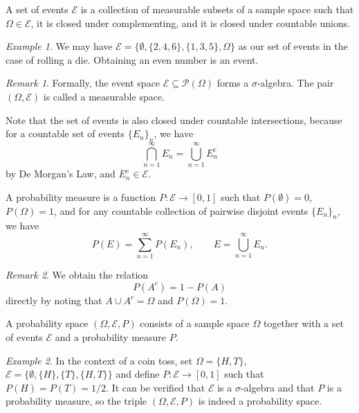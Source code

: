 \documentclass[11pt]{article}
\theoremstyle{definition}
\theoremstyle{remark}
\newtheorem*{remark}{Remark}
\newtheorem*{example}{Example}
\numberwithin{equation}{section}
\begin{document}
    \begin{definition}[Events]
        A set of events $\mathcal{E}$ is a collection of measurable subsets of
        a sample space such that $\Omega \in \mathcal{E}$, it is closed under
        complementing, and it is closed under countable unions.
    \end{definition}
    \begin{example}
        We may have $\mathcal{E} = \{\emptyset, \{2, 4, 6\}, \{1, 3, 5\},
        \Omega\}$ as our set of events in the case of rolling a die.
        Obtaining an even number is an event.
    \end{example}
    \begin{remark}
        Formally, the event space $\mathcal{E} \subseteq \mathcal{P}(\Omega)$ forms
        a $\sigma$-algebra. The pair $(\Omega, \mathcal{E})$ is called a measurable
        space.
    \end{remark}

    Note that the set of events is also closed under countable intersections,
    because for a countable set of events $\{E_n\}_n$, we have \[
        \bigcap_{n = 1}^\infty E_n = \bigcup_{n = 1}^\infty E_n^c
    \] by De Morgan's Law, and $E_n^c \in \mathcal{E}$.
    
    \begin{definition}[Probability]
        A probability measure is a function $P\colon \mathcal{E} \to [0, 1]$ such
        that $P(\emptyset) = 0$, $P(\Omega) = 1$, and for any countable collection of
        pairwise disjoint events $\{E_n\}_n$, we have \[
            P(E) = \sum_{n = 1}^\infty P(E_n), \qquad E = \bigcup_{n = 1}^\infty E_n.
        \] 
    \end{definition}
    \begin{remark}
        We obtain the relation \[
            P(A^c) = 1 - P(A)
        \] directly by noting that $A \cup A^c = \Omega$ and $P(\Omega) = 1$.
    \end{remark}

    \begin{definition}
        A probability space $(\Omega, \mathcal{E}, P)$ consists of a sample space
        $\Omega$ together with a set of events $\mathcal{E}$ and a probability
        measure $P$.
    \end{definition}
    \begin{example}
        In the context of a coin toss, set $\Omega = \{H, T\}$, $\mathcal{E} =
        \{\emptyset, \{H\}, \{T\}, \{H, T\}\}$ and define $P\colon \mathcal{E} \to
        [0, 1]$ such that $P(H) = P(T) = 1 /2$. It can be verified that
        $\mathcal{E}$ is a $\sigma$-algebra and that $P$ is a probability measure,
        so the triple $(\Omega, \mathcal{E}, P)$ is indeed a probability space.
    \end{example}
\end{document}
